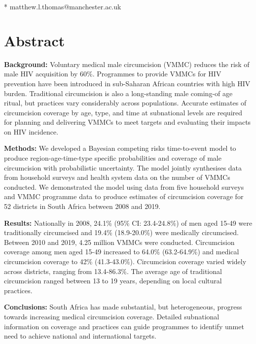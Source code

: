 \documentclass{article}
\begin{document}
* matthew.l.thomas@manchester.ac.uk
\newpage


\section*{Abstract}


{\bf Background:} Voluntary medical male circumcision (VMMC) reduces the risk of male HIV acquisition by 60\%. Programmes to provide VMMCs for HIV prevention have been introduced in sub-Saharan African countries with high HIV burden. Traditional circumcision is also a long-standing male coming-of age ritual, but practices vary considerably across populations. Accurate estimates of circumcision coverage by age, type, and time at subnational levels are required for planning and delivering VMMCs to meet targets and evaluating their impacts on HIV incidence.

{\bf Methods:} We developed a Bayesian competing risks time-to-event model to produce region-age-time-type specific probabilities and coverage of male circumcision with probabilistic uncertainty. The model jointly synthesises data from household surveys and health system data on the number of VMMCs conducted. We demonstrated the model using data from five household surveys and VMMC programme data to produce estimates of circumcision coverage for 52 districts in South Africa between 2008 and 2019.

{\bf Results:} Nationally in 2008, 24.1\% (95\% CI: 23.4-24.8\%) of men aged 15-49 were traditionally circumcised and 19.4\% (18.9-20.0\%) were medically circumcised. Between 2010 and 2019, 4.25 million VMMCs were conducted. Circumcision coverage among men aged 15-49 increased to 64.0\% (63.2-64.9\%) and medical circumcision coverage to 42\% (41.3-43.0\%). Circumcision coverage varied widely across districts, ranging from 13.4-86.3\%. The average age of traditional circumcision ranged between 13 to 19 years, depending on local cultural practices.

{\bf Conclusions:} South Africa has made substantial, but heterogeneous, progress towards increasing medical circumcision coverage. Detailed subnational information on coverage and practices can guide programmes to identify unmet need to achieve national and international targets.
\end{document}
